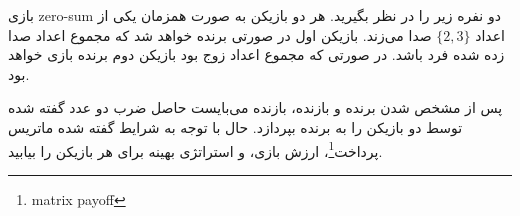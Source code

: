 بازی
zero-sum
دو نفره زیر را در نظر بگیرید. هر دو بازیکن به صورت همزمان یکی از اعداد
$\{2,3\}$
صدا می‌زند. بازیکن اول در صورتی برنده خواهد شد که مجموع اعداد صدا زده شده فرد باشد. در صورتی که مجموع اعداد زوج بود بازیکن دوم برنده بازی خواهد بود. 

پس از مشخص شدن برنده و بازنده، بازنده می‌بایست حاصل‌ ضرب دو عدد گفته شده توسط دو بازیکن را به برنده بپردازد. حال با توجه به شرایط گفته شده ماتریس پرداخت\footnote{matrix payoff}، ارزش بازی، و استراتژی بهینه برای هر بازیکن را بیابید.